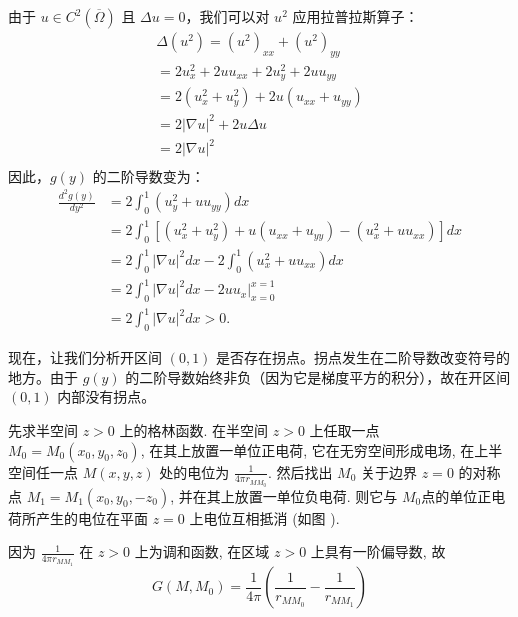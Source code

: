 \begin{questions}
\begin{solution}
由于 $u \in C^{2}(\overline{\Omega})$ 且 $\Delta u = 0$，我们可以对 $u^2$ 应用拉普拉斯算子：
$$ \begin{array}{l} \Delta\left(u^{2}\right)=\left(u^{2}\right)_{x x}+\left(u^{2}\right)_{y y} \\ =2 u_{x}^{2}+2u u_{x x}+2 u_{y}^{2}+2u u_{y y} \\ =2\left(u_{x}^{2}+u_{y}^{2}\right)+2u\left(u_{x x}+u_{y y}\right) \\ =2|\nabla u|^{2}+2u \Delta u \\ =2|\nabla u|^{2} \\\end{array} $$
因此，$g(y)$ 的二阶导数变为：
$$ \begin{aligned} \frac{d^{2} g(y)}{d y^{2}}&=2 \int_{0}^{1} (u_{y}^{2}+u u_{y y}) d x \\& =2 \int_{0}^{1}\left[\left(u_{x}^{2}+u_{y}^{2}\right)+u\left(u_{x x}+u_{y y}\right)-\left(u_{x}^{2}+u u_{x x}\right)\right] d x \\ & =2 \int_{0}^{1}|\nabla u|^{2} d x-2 \int_{0}^{1}\left(u_{x}^{2}+u u_{x x}\right) d x \\  & =2 \int_{0}^{1}|\nabla u|^{2} d x-2 \left.u u_{x} \right|_{x=0} ^{x=1} \\ & =2 \int_{0}^{1}|\nabla u|^{2} d x>0 .\end{aligned} $$

现在，让我们分析开区间 $(0,1)$ 是否存在拐点。拐点发生在二阶导数改变符号的地方。由于 $g(y)$ 的二阶导数始终非负（因为它是梯度平方的积分），故在开区间 $(0,1)$ 内部没有拐点。
\end{solution}
\begin{solution}
    先求半空间 $ z>0 $ 上的格林函数. 在半空间 $ z>0 $ 上任取一点 $ M_{0}=M_{0}\left(x_{0}, y_{0}, z_{0}\right) $, 在其上放置一单位正电荷, 它在无穷空间形成电场, 在上半空间任一点 $ M(x, y, z) $ 处的电位为 $ \frac{1}{4 \pi r_{M M_{0}}} $. 然后找出 $ M_{0} $ 关于边界 $ z=0 $ 的对称点 $ M_{1}=M_{1}\left(x_{0}, y_{0},-z_{0}\right) $, 并在其上放置一单位负电荷. 则它与 $ M_{0} $点的单位正电荷所产生的电位在平面 $ z=0 $ 上电位互相抵消 (如图 ).
    
因为 $ \frac{1}{4 \pi r_{M M_{1}}} $ 在 $ z>0 $ 上为调和函数, 在区域 $ z> 0 $ 上具有一阶偏导数, 故
$$
G\left(M, M_{0}\right)=\frac{1}{4 \pi}\left(\frac{1}{r_{M M_{0}}}-\frac{1}{r_{M M_{1}}}\right)
$$


\end{solution}
\end{questions}
